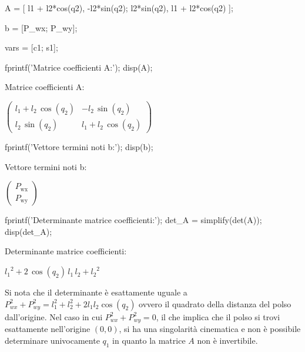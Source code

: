 \documentclass[11pt, a4paper]{article}
\begin{document}
\begin{matlabcode}
A = [ l1 + l2*cos(q2),  -l2*sin(q2);
    l2*sin(q2),       l1 + l2*cos(q2) ];

b = [P_wx; P_wy];

vars = [c1; s1];

fprintf('Matrice coefficienti A:\n');
disp(A);
\end{matlabcode}
\begin{matlaboutput}
Matrice coefficienti A:
\end{matlaboutput}
\begin{matlabsymbolicoutput}
$\displaystyle \left(\begin{array}{cc}
l_1 +l_2 \,\cos \left(q_2 \right) & -l_2 \,\sin \left(q_2 \right)\\
l_2 \,\sin \left(q_2 \right) & l_1 +l_2 \,\cos \left(q_2 \right)
\end{array}\right)$
\end{matlabsymbolicoutput}
\begin{matlabcode}
fprintf('Vettore termini noti b:\n');
disp(b);
\end{matlabcode}
\begin{matlaboutput}
Vettore termini noti b:
\end{matlaboutput}
\begin{matlabsymbolicoutput}
$\displaystyle \left(\begin{array}{c}
P_{\textrm{wx}} \\
P_{\textrm{wy}}
\end{array}\right)$
\end{matlabsymbolicoutput}
\begin{matlabcode}
fprintf('Determinante matrice coefficienti:\n');
det_A = simplify(det(A));
disp(det_A);
\end{matlabcode}
\begin{matlaboutput}
Determinante matrice coefficienti:
\end{matlaboutput}
\begin{matlabsymbolicoutput}
$\displaystyle {l_1 }^2 +2\,\cos \left(q_2 \right)\,l_1 \,l_2 +{l_2 }^2 $
\end{matlabsymbolicoutput}

\begin{par}
\begin{flushleft}
Si nota che il determinante è esattamente uguale a $P_{wx}^2 +P_{wy}^2 =l_1^2 +l_2^2 +2l_1 l_2 \cos (q_2 )$ ovvero il quadrato della distanza del polso dall'origine. Nel caso in cui $P_{wx}^2 +P_{wy}^2 =0$, il che implica che il polso si trovi esattamente nell'origine $(0,0)$, si ha una singolarità cinematica e non è possibile determinare univocamente $q_1$ in quanto la matrice $A$ non è invertibile.
\end{flushleft}
\end{par}
\end{document}
